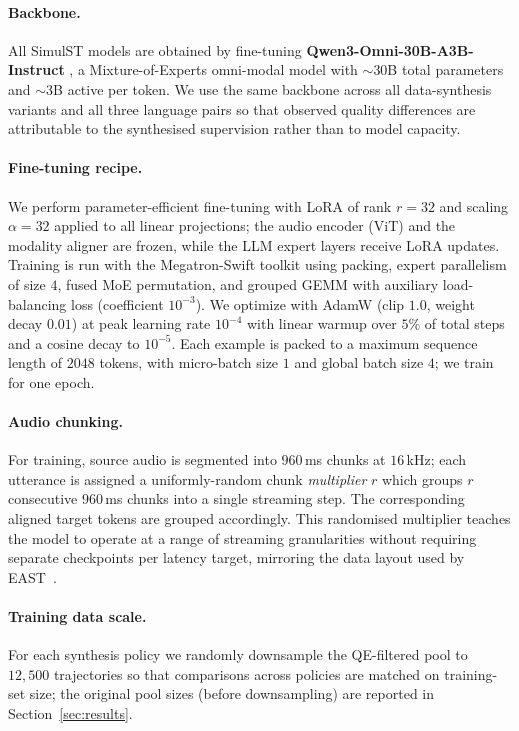 \paragraph{Backbone.} All SimulST models are obtained by fine-tuning
\textbf{Qwen3-Omni-30B-A3B-Instruct} \citep{qwen3omni}, a Mixture-of-Experts
omni-modal model with $\sim$30B total parameters and $\sim$3B active per
token. We use the same backbone across all data-synthesis variants and all
three language pairs so that observed quality differences are attributable to
the synthesised supervision rather than to model capacity.

\paragraph{Fine-tuning recipe.} We perform parameter-efficient
fine-tuning with LoRA \citep{hu2022lora} of rank $r{=}32$ and scaling
$\alpha{=}32$ applied to all linear projections; the audio encoder (ViT) and
the modality aligner are frozen, while the LLM expert layers receive LoRA
updates. Training is run with the Megatron-Swift toolkit using packing,
expert parallelism of size $4$, fused MoE permutation, and grouped GEMM with
auxiliary load-balancing loss (coefficient $10^{-3}$). We optimize with
AdamW (clip $1.0$, weight decay $0.01$) at peak learning rate $10^{-4}$ with
linear warmup over $5\%$ of total steps and a cosine decay to $10^{-5}$.
Each example is packed to a maximum sequence length of $2048$ tokens, with
micro-batch size $1$ and global batch size $4$; we train for one epoch.

\paragraph{Audio chunking.} For training, source audio is segmented into
$960$\,ms chunks at $16$\,kHz; each utterance is assigned a uniformly-random
chunk \emph{multiplier} $r$ which groups $r$ consecutive $960$\,ms chunks
into a single streaming step. The corresponding aligned target tokens are
grouped accordingly. This randomised multiplier teaches the model to
operate at a range of streaming granularities without requiring separate
checkpoints per latency target, mirroring the data layout used by
EAST~\citep{EAST}.

\paragraph{Training data scale.} For each synthesis policy we randomly
downsample the QE-filtered pool to $12{,}500$ trajectories so that
comparisons across policies are matched on training-set size; the original
pool sizes (before downsampling) are reported in
Section~\ref{sec:results}.

